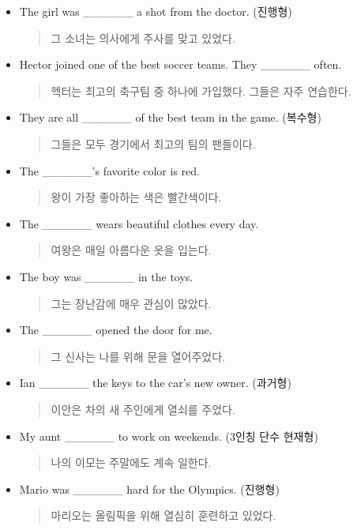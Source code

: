 \documentclass{article}
\begin{document}
\begin{addmargin}[1em]{1em}
\begin{itemize}
\begin{quote}
    \end{quote}
    \item The girl was \_\_\_\_\_\_ a shot from the doctor. (진행형)
    \begin{quote}
    그 소녀는 의사에게 주사를 맞고 있었다.
    \end{quote}
    \item Hector joined one of the best soccer teams. They \_\_\_\_\_\_ often.
    \begin{quote}
    헥터는 최고의 축구팀 중 하나에 가입했다. 그들은 자주 연습한다.
    \end{quote}
    \item They are all \_\_\_\_\_\_ of the best team in the game. (복수형)
    \begin{quote}
    그들은 모두 경기에서 최고의 팀의 팬들이다.
    \end{quote}
    \item The \_\_\_\_\_\_'s favorite color is red.
    \begin{quote}
    왕이 가장 좋아하는 색은 빨간색이다.
    \end{quote}
    \item The \_\_\_\_\_\_ wears beautiful clothes every day.
    \begin{quote}
    여왕은 매일 아름다운 옷을 입는다.
    \end{quote}
    \item The boy was \_\_\_\_\_\_ in the toys.
    \begin{quote}
    그는 장난감에 매우 관심이 많았다.
    \end{quote}
    \item The \_\_\_\_\_\_ opened the door for me.
    \begin{quote}
    그 신사는 나를 위해 문을 열어주었다.
    \end{quote}
    \item Ian \_\_\_\_\_\_ the keys to the car's new owner. (과거형)
    \begin{quote}
    이안은 차의 새 주인에게 열쇠를 주었다.
    \end{quote}
    \item My aunt \_\_\_\_\_\_ to work on weekends. (3인칭 단수 현재형)
    \begin{quote}
    나의 이모는 주말에도 계속 일한다.
    \end{quote}
    \item Mario was \_\_\_\_\_\_ hard for the Olympics. (진행형)
    \begin{quote}
    마리오는 올림픽을 위해 열심히 훈련하고 있었다.

\end{quote}
\end{itemize}
\end{addmargin}
\end{document}
